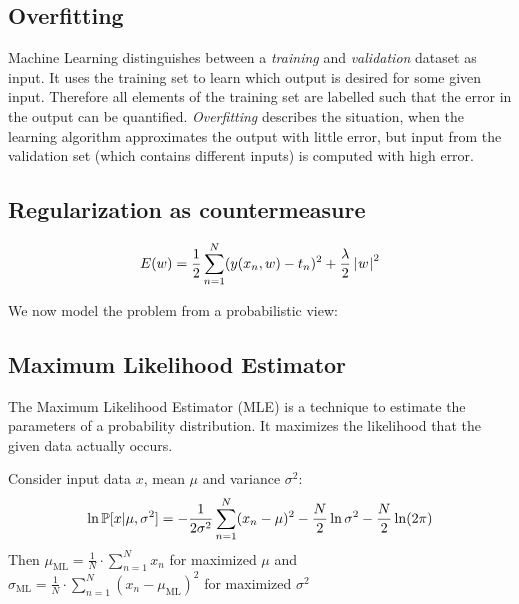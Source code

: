 \subsection{Overfitting}
\label{sec:bp-overfitting}
%
Machine Learning distinguishes between a \emph{training} and \emph{validation} dataset as input.
It uses the training set to learn which output is desired for some given input.
Therefore all elements of the training set are labelled such that the error in the output can be quantified.
\emph{Overfitting} describes the situation, when the learning algorithm approximates the output with little error,
but input from the validation set (which contains different inputs) is computed with high error.


\subsection{Regularization as countermeasure}
\[ E(w) = \frac12 \sum_{n=1}^N (y(x_n, w) - t_n)^2 + \frac{\lambda}{2} \left|\hspace{0.6999pt}w\hspace{0.6999pt}\right|^2 \]


We now model the problem from a probabilistic view:

\subsection{Maximum Likelihood Estimator}
%
%
%
The Maximum Likelihood Estimator (MLE) is a technique to estimate the parameters of a probability distribution.
It maximizes the likelihood that the given data actually occurs.


\begin{theorem}
  Consider input data $x$, mean $\mu$ and variance $\sigma^2$:
  \[ \ln{\mathbb P[x | \mu, \sigma^2]} = -\frac1{2\sigma^2} \sum_{n=1}^N (x_n - \mu)^2 - \frac{N}{2} \ln{\sigma^2} - \frac{N}{2} \ln(2\pi) \]
  Then
  $\mu_{\text{ML}} = \frac{1}{N} \cdot \sum_{n=1}^N x_n$ for maximized $\mu$ and \\
    $\sigma_{\text{ML}} = \frac{1}{N}\cdot \sum_{n=1}^N (x_n - \mu_{\text{ML}})^2$ for maximized $\sigma^2$
\end{theorem}

